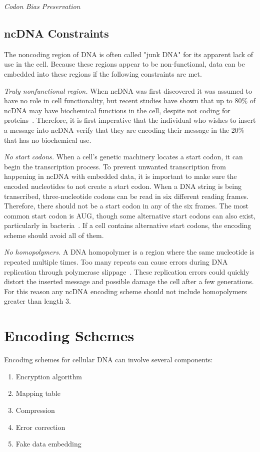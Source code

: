 \documentclass[USenglish,oneside,twocolumn]{article}
\begin{document}
\textit{Codon Bias Preservation}


\subsection{ncDNA Constraints}

The noncoding region of DNA is often called "junk DNA" for its apparent lack of use in the cell. Because these regions appear to be non-functional, data can be embedded into these regions if the following constraints are met.

\textit{Truly nonfunctional region.} When ncDNA was first discovered it was assumed to have no role in cell functionality, but recent studies have shown that up to 80\% of ncDNA may have biochemical functions in the cell, despite not coding for proteins~\cite{EPC2012N}. Therefore, it is first imperative that the individual who wishes to insert a message into ncDNA verify that they are encoding their message in the 20\% that has no biochemical use.

\textit{No start codons.} When a cell's genetic machinery locates a start codon, it can begin the transcription process. To prevent unwanted transcription from happening in ncDNA with embedded data, it is important to make sure the encoded nucleotides to not create a start codon. When a DNA string is being transcribed, three-nucleotide codons can be read in six different reading frames. Therefore, there should not be a start codon in any of the six frames. The most common start codon is AUG, though some alternative start codons can also exist, particularly in bacteria~\cite{B1997S}. If a cell contains alternative start codons, the encoding scheme should avoid all of them.

\textit{No homopolymers.} A DNA homopolymer is a region where the same nucleotide is repeated multiple times. Too many repeats can cause errors during DNA replication through polymerase slippage~\cite{VCE2001TEJ}. These replication errors could quickly distort the inserted message and possible damage the cell after a few generations. For this reason any ncDNA encoding scheme should not include homopolymers greater than length 3.


\section{Encoding Schemes}

Encoding schemes for cellular DNA can involve several components:

\begin{enumerate}
\item Encryption algorithm
\item Mapping table
\item Compression
\item Error correction
\item Fake data embedding
\end{enumerate}
\end{document}
